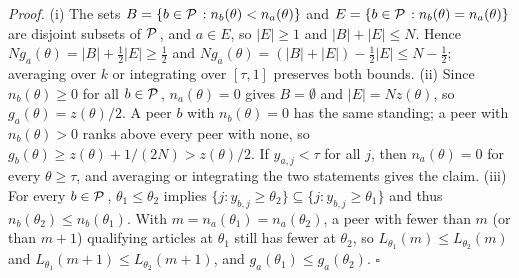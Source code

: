 \documentclass[11pt]{article}
\begin{document}
\noindent\emph{Proof.}
(i) The sets $B = \{b \in {\mathcal{P}\mkern2.5mu} : n_b(\theta) < n_a(\theta)\}$ and $E = \{b \in {\mathcal{P}\mkern2.5mu} : n_b(\theta) = n_a(\theta)\}$ are
disjoint subsets of ${\mathcal{P}\mkern2.5mu}$, and $a \in E$, so $|E| \ge 1$ and $|B| + |E| \le N$. Hence $N g_a(\theta) = |B| +
\tfrac12|E| \ge \tfrac12$ and $N g_a(\theta) = (|B| + |E|) - \tfrac12|E| \le N - \tfrac12$; averaging over $k$ or
integrating over $[\tau, 1]$ preserves both bounds.
(ii) Since $n_b(\theta) \ge 0$ for all $b \in {\mathcal{P}\mkern2.5mu}$, $n_a(\theta) = 0$ gives $B = \emptyset$ and $|E| = N z(\theta)$, so
$g_a(\theta) = z(\theta)/2$. A peer $b$ with $n_b(\theta) = 0$ has the same standing; a peer with $n_b(\theta) > 0$ ranks
above every peer with none, so $g_b(\theta) \ge z(\theta) + 1/(2N) > z(\theta)/2$. If $y_{a,j} < \tau$ for all $j$, then
$n_a(\theta) = 0$ for every $\theta \ge \tau$, and averaging or integrating the two statements gives the claim.
(iii) For every $b \in {\mathcal{P}\mkern2.5mu}$, $\theta_1 \le \theta_2$ implies $\{j : y_{b,j} \ge \theta_2\} \subseteq \{j : y_{b,j}
\ge \theta_1\}$ and thus $n_b(\theta_2) \le n_b(\theta_1)$. With $m = n_a(\theta_1) = n_a(\theta_2)$, a peer with fewer
than $m$ (or than $m + 1$) qualifying articles at $\theta_1$ still has fewer at $\theta_2$, so $L_{\theta_1}(m) \le
L_{\theta_2}(m)$ and $L_{\theta_1}(m + 1) \le L_{\theta_2}(m + 1)$, and $g_a(\theta_1) \le g_a(\theta_2)$. \hfill$\square$
\end{document}
